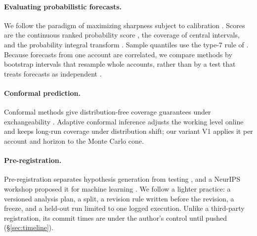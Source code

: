 \paragraph{Evaluating probabilistic forecasts.} We follow the paradigm of
maximizing sharpness subject to calibration
\citep{gneiting2007calibration}. Scores are the continuous ranked
probability score \citep{matheson1976,gneiting2007strictly}, the coverage
of central intervals, and the probability integral transform
\citep{dawid1984}. Sample quantiles use the type-7 rule of
\citet{hyndman1996}. Because forecasts from one account are correlated, we
compare methods by bootstrap intervals that resample whole accounts,
rather than by a test that treats forecasts as independent
\citep[cf.][]{diebold1995}.

\paragraph{Conformal prediction.} Conformal methods give distribution-free
coverage guarantees under exchangeability \citep{vovk2005alrw}. Adaptive
conformal inference \citep{gibbs2021aci} adjusts the working level online
and keeps long-run coverage under distribution shift; our variant V1
applies it per account and horizon to the Monte Carlo cone.

\paragraph{Pre-registration.} Pre-registration separates hypothesis
generation from testing \citep{nosek2018prereg}, and a NeurIPS workshop
proposed it for machine learning \citep{pmlr148prereg}. We follow a lighter practice: a
versioned analysis plan, a split, a revision rule written before the
revision, a freeze, and a held-out run limited to one logged execution.
Unlike a third-party registration, its commit times are under the
author's control until pushed (\S\ref{sec:timeline}).
